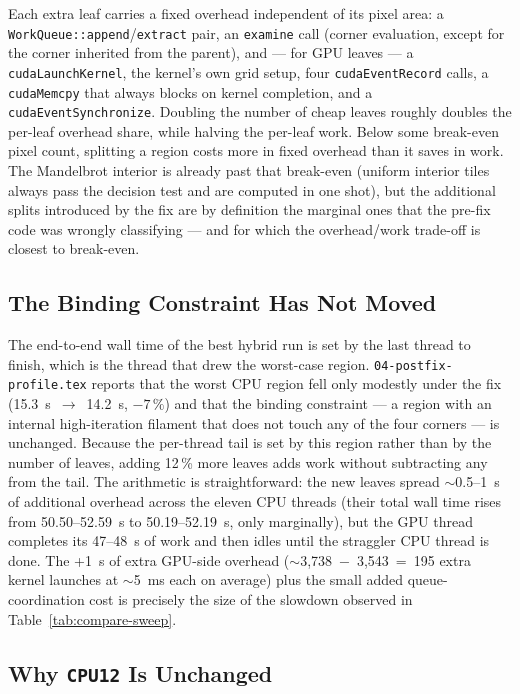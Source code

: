 \documentclass[
	english,
	letterpaper, oneside
]{article}
\begin{document}
\noindent
Each extra leaf carries a fixed overhead independent of its pixel area:
a \texttt{WorkQueue::append}/\texttt{extract} pair, an \texttt{examine}
call (corner evaluation, except for the corner inherited from the
parent), and --- for GPU leaves --- a \texttt{cudaLaunchKernel}, the
kernel's own grid setup, four \texttt{cudaEventRecord} calls, a
\texttt{cudaMemcpy} that always blocks on kernel completion, and a
\texttt{cudaEventSynchronize}. Doubling the number of cheap leaves
roughly doubles the per-leaf overhead share, while halving the per-leaf
work. Below some break-even pixel count, splitting a region costs more
in fixed overhead than it saves in work. The Mandelbrot interior is
already past that break-even (uniform interior tiles always pass the
decision test and are computed in one shot), but the additional splits
introduced by the fix are by definition the marginal ones that the
pre-fix code was wrongly classifying --- and for which the
overhead/work trade-off is closest to break-even.

\subsection{The Binding Constraint Has Not Moved}

The end-to-end wall time of the best hybrid run is set by the last
thread to finish, which is the thread that drew the worst-case
region. \texttt{04-postfix-profile.tex} reports that the worst CPU region
fell only modestly under the fix (15.3~s~$\to$~14.2~s, $-7\,\%$) and
that the binding constraint --- a region with an internal
high-iteration filament that does not touch any of the four
corners --- is unchanged. Because the per-thread tail is set by this
region rather than by the number of leaves, adding 12\,\% more leaves
adds work without subtracting any from the tail. The arithmetic is
straightforward: the new leaves spread $\sim$0.5--1~s of additional
overhead across the eleven CPU threads (their total wall time rises
from 50.50--52.59~s to 50.19--52.19~s, only marginally), but the GPU
thread completes its 47--48~s of work and then idles until the
straggler CPU thread is done. The +1~s of extra GPU-side overhead
($\sim$3{,}738~$-$~3{,}543~=~195 extra kernel launches at $\sim$5~ms
each on average) plus the small added queue-coordination cost is
precisely the size of the slowdown observed in
Table~\ref{tab:compare-sweep}.

\subsection{Why \texttt{CPU12} Is Unchanged}
\end{document}
